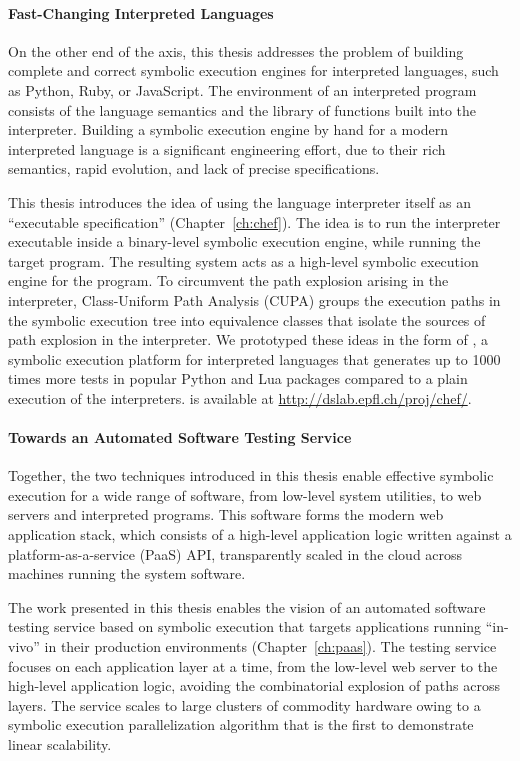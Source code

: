 \paragraph{Fast-Changing Interpreted Languages}

On the other end of the axis, this thesis addresses the problem of building complete and correct symbolic execution engines for interpreted languages, such as Python, Ruby, or JavaScript.
%
The environment of an interpreted program consists of the language semantics and the library of functions built into the interpreter.
%
Building a symbolic execution engine by hand for a modern interpreted language is a significant engineering effort, due to their rich semantics, rapid evolution, and lack of precise specifications.

This thesis introduces the idea of using the language interpreter itself as an ``executable specification'' (Chapter~\ref{ch:chef}).
%
The idea is to run the interpreter executable inside a binary-level symbolic execution engine, while running the target program.  The resulting system acts as a high-level symbolic execution engine for the program.
%
To circumvent the path explosion arising in the interpreter, Class-Uniform Path Analysis (CUPA) groups the execution paths in the symbolic execution tree into equivalence classes that isolate the sources of path explosion in the interpreter.
%
We prototyped these ideas in the form of \chef, a symbolic execution platform for interpreted languages that generates up to 1000 times more tests in popular Python and Lua packages compared to a plain execution of the interpreters.
%
\chef is available at {\url{http://dslab.epfl.ch/proj/chef/}}.


\paragraph{Towards an Automated Software Testing Service}

Together, the two techniques introduced in this thesis enable effective symbolic execution for a wide range of software, from low-level system utilities, to web servers and interpreted programs.
%
This software forms the modern web application stack, which consists of a high-level application logic written against a platform-as-a-service (PaaS) API, transparently scaled in the cloud across machines running the system software.

The work presented in this thesis enables the vision of an automated software testing service based on symbolic execution that targets applications running ``in-vivo'' in their production environments (Chapter~\ref{ch:paas}).
%
The testing service focuses on each application layer at a time, from the low-level web server to the high-level application logic, avoiding the combinatorial explosion of paths across layers.
%
The service scales to large clusters of commodity hardware owing to a symbolic execution parallelization algorithm that is the first to demonstrate linear scalability.


